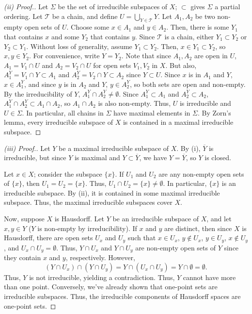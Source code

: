 \begin{proof}[(ii) Proof.]
Let $\Sigma$ be the set of irreducible subspaces of $X$; $\subset$ gives $\Sigma$ a partial ordering. Let $\mathcal{T}$ be a chain, and define 
$U = \bigcup_{Y \in \mathcal{T}} Y$. Let $A_1, A_2$ be two non-empty open sets of $U$. Choose some $x \in A_1$ and $y \in A_2$. 
Then, there is some $Y_1$ that contains $x$ and some $Y_2$ that contains $y$. Since $\mathcal{T}$ is a chain, either $Y_1 \subset Y_2$ or $Y_2 \subset Y_1$. 
Without loss of generality, assume $Y_1 \subset Y_2$. Then, $x \in Y_1 \subset Y_2$, so $x, y \in Y_2$. For convenience, write $Y = Y_2$. 
Note that since $A_1,A_2$ are open in $U$, $A_1 = V_1 \cap U$ and $A_2 = V_2 \cap U$ for open sets $V_1, V_2$ in $X$. But also, $A_1^Y = V_1 \cap Y \subset A_1$ 
and $A_2^Y = V_2 \cap Y \subset A_2$ since $Y \subset U$. Since $x$ is in $A_1$ and $Y$, $x \in A_1^Y$, and since $y$ is in $A_2$ and $Y$, $y \in A_2^Y$, so both sets 
are open and non-empty. By the irreducibility of $Y$, $A_1^Y \cap A_2^Y \neq \emptyset$. Since $A_1^Y \subset A_1$ and $A_2^Y \subset A_2$, $A_1^Y \cap A_2^Y \subset A_1 \cap A_2$,
so $A_1 \cap A_2$ is also non-empty. Thus, $U$ is irreducible and $U \in \Sigma$. In particular, all chains in $\Sigma$ have maximal elements in $\Sigma$. 
By Zorn's lemma, every irreducible subspace of $X$ is contained in a maximal irreducible subspace.
\end{proof}

\begin{proof}[(iii) Proof.]
Let $Y$ be a maximal irreducible subspace of $X$. By (i), $\overline{Y}$ is irreducible, but since $Y$ is maximal and $Y \subset \overline{Y}$, we have
$Y = \overline{Y}$, so $Y$ is closed.

Let $x \in X$; consider the subspace $\{x\}$. If $U_1$ and $U_2$ are any non-empty open sets of $\{x\}$, then $U_1 = U_2 = \{x\}$. Thus, $U_1 \cap U_2 = \{x\} \neq \emptyset$.
In particular, $\{x\}$ is an irreducible subspace. By (ii), it is contained in some maximal irreducible subspace. Thus, the maximal irreducible subspaces cover $X$.

Now, suppose $X$ is Hausdorff. Let $Y$ be an irreducible subspace of $X$, and let $x,y \in Y$ ($Y$ is non-empty by irreducibility). If $x$ and $y$ are distinct, then since $X$ is Hausdorff,
there are open sets $U_x$ and $U_y$ such that $x \in U_x$, $y \not\in U_x$, $y \in U_y$, $x \not\in U_y$, and $U_x \cap U_y = \emptyset$. Thus, $Y \cap U_x$
and $Y \cap U_y$ are non-empty open sets of $Y$ since they contain $x$ and $y$, respectively. However, 
$$(Y \cap U_x) \cap (Y \cap U_y) = Y \cap (U_x \cap U_y) = Y \cap \emptyset = \emptyset.$$
Thus, $Y$ is not irreducible, yielding a contradiction. Thus, $Y$ cannot have more than one point. Conversely, we've already shown that one-point sets are
irreducible subspaces. Thus, the irreducible components of Hausdorff spaces are one-point sets.
\end{proof}

